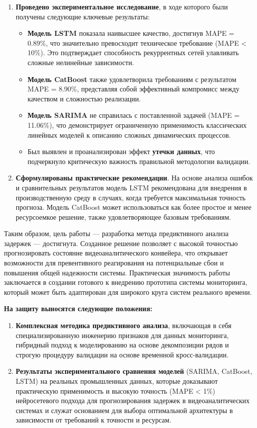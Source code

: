 \begin{enumerate}
    \item \textbf{Проведено экспериментальное исследование}, в ходе которого были получены следующие ключевые результаты:
    \begin{itemize}
        \item \textbf{Модель LSTM} показала наивысшее качество, достигнув MAPE = 0.89\%, что значительно превосходит техническое требование (MAPE < 10\%). Это подтверждает способность рекуррентных сетей улавливать сложные нелинейные зависимости.
        \item \textbf{Модель CatBoost} также удовлетворила требованиям с результатом MAPE = 8.90\%, представляя собой эффективный компромисс между качеством и сложностью реализации.
        \item \textbf{Модель SARIMA} не справилась с поставленной задачей (MAPE = 11.06\%), что демонстрирует ограниченную применимость классических линейных моделей к описанию сложных динамических процессов.
        \item Был выявлен и проанализирован эффект \textbf{утечки данных}, что подчеркнуло критическую важность правильной методологии валидации.
    \end{itemize}

    \item \textbf{Сформулированы практические рекомендации}. На основе анализа ошибок и сравнительных результатов модель LSTM рекомендована для внедрения в производственную среду в случаях, когда требуется максимальная точность прогноза. Модель CatBoost может использоваться как более простое и менее ресурсоемкое решение, также удовлетворяющее базовым требованиям.
\end{enumerate}

Таким образом, цель работы — разработка метода предиктивного анализа задержек — достигнута. Созданное решение позволяет с высокой точностью прогнозировать состояние видеоаналитического конвейера, что открывает возможности для превентивного реагирования на потенциальные сбои и повышения общей надежности системы. Практическая значимость работы заключается в создании готового к внедрению прототипа системы мониторинга, который может быть адаптирован для широкого круга систем реального времени.

\vspace{1cm}
\textbf{На защиту выносятся следующие положения:}
\begin{enumerate}
    \item \textbf{Комплексная методика предиктивного анализа}, включающая в себя специализированную инженерию признаков для данных мониторинга, гибридный подход к моделированию на основе декомпозиции рядов и строгую процедуру валидации на основе временной кросс-валидации.
    \item \textbf{Результаты экспериментального сравнения моделей} (SARIMA, CatBoost, LSTM) на реальных промышленных данных, которые доказывают практическую применимость и высокую точность (MAPE < 1\%) нейросетевого подхода для прогнозирования задержек в видеоаналитических системах и служат основанием для выбора оптимальной архитектуры в зависимости от требований к точности и ресурсам.
\end{enumerate}
